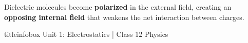 \begin{frame}
\begin{importantbox}
\vspace{0.05cm}
Dielectric molecules become \textbf{polarized} in the external field, creating an \textbf{opposing internal field} that weakens the net interaction between charges.
\vspace{0.05cm}
\end{importantbox}

\vfill

\begin{beamercolorbox}[wd=\textwidth,ht=0.5cm,dp=0.1cm,center]{titleinfobox}
    \small\color{coolgray} Unit 1: Electrostatics | Class 12 Physics
\end{beamercolorbox}
\end{frame}

